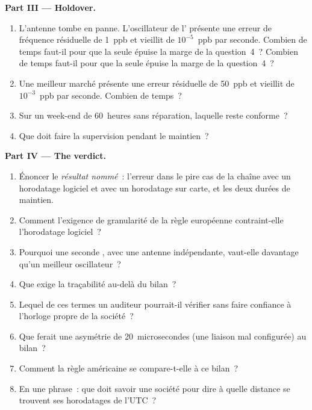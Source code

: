 \begin{problem}
\medskip\noindent\textbf{Part III --- Holdover.}
\begin{enumerate}[resume]
\item L'antenne tombe en panne. L'oscillateur de l' présente une erreur de fréquence résiduelle de 1~ppb et vieillit de $10^{-5}$~ppb par seconde. Combien de temps faut-il pour que la seule  épuise la marge de la question~4~?
  Combien de temps faut-il pour que la seule  épuise la marge de la question~4~?
\item Une  meilleur marché présente une erreur résiduelle de 50~ppb et vieillit de $10^{-3}$~ppb par seconde. Combien de temps~?
\item Sur un week-end de 60~heures sans réparation, laquelle reste conforme~?
\item Que doit faire la supervision pendant le maintien~?
\end{enumerate}

\medskip\noindent\textbf{Part IV --- The verdict.}
\begin{enumerate}[resume]
\item Énoncer le \emph{résultat nommé}~: l'erreur dans le pire cas de la chaîne avec un horodatage logiciel et avec un horodatage sur carte, et les deux durées de maintien.
\item Comment l'exigence de granularité de la règle européenne contraint-elle l'horodatage logiciel~?
\item Pourquoi une seconde , avec une antenne indépendante, vaut-elle davantage qu'un meilleur oscillateur~?
\item Que exige la traçabilité au-delà du bilan~?
\item Lequel de ces termes un auditeur pourrait-il vérifier sans faire confiance à l'horloge propre de la société~?
\item Que ferait une asymétrie de 20~microsecondes (une liaison mal configurée) au bilan~?
\item Comment la règle américaine se compare-t-elle à ce bilan~?
\item En une phrase~: que doit savoir une société pour dire à quelle distance se trouvent ses horodatages de l'UTC~?
\end{enumerate}
\end{problem}

